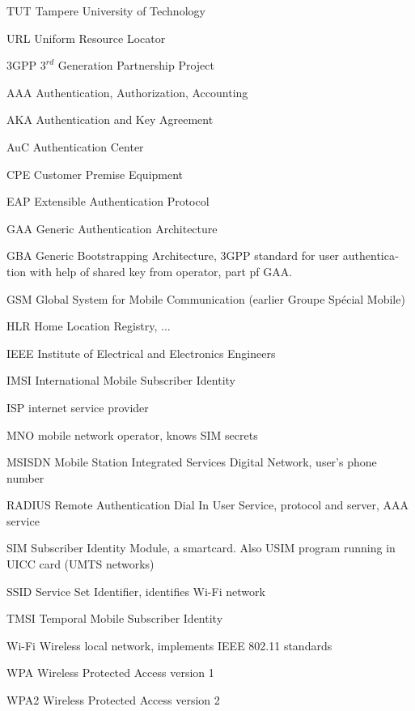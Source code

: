 \documentclass[12pt,a4paper,english]{tutthesis}
\begin{document}
\begin{otherlanguage}{english}
\begin{termlist}
\item [TUT]    Tampere University of Technology
\item [URL]    Uniform Resource Locator
\item[3GPP] $3^{rd}$ Generation Partnership Project
\item[AAA] Authentication, Authorization, Accounting
\item[AKA] Authentication and Key Agreement %
\item[AuC] Authentication Center
\item[CPE] Customer Premise Equipment %
\item[EAP] Extensible Authentication Protocol %
\item[GAA] Generic Authentication Architecture %
\item[GBA] Generic Bootstrapping Architecture, 3GPP standard for user authentication with help of shared key from operator, part pf GAA.
\item[GSM] Global System for Mobile Communication (earlier Groupe Spécial Mobile)
\item[HLR] Home Location Registry, ...
\item[IEEE] Institute of Electrical and Electronics Engineers
\item[IMSI] International Mobile Subscriber Identity
\item[ISP] internet service provider
\item[MNO] mobile network operator, knows SIM secrets
\item[MSISDN] Mobile Station Integrated Services Digital Network, user's phone number
\item[RADIUS] Remote Authentication Dial In User Service, protocol and server,  AAA service 
\item[SIM]  Subscriber Identity Module, a smartcard. Also USIM program running in UICC card (UMTS networks)
\item[SSID] Service Set Identifier, identifies Wi-Fi network
\item[TMSI] Temporal Mobile Subscriber Identity
\item[Wi-Fi] Wireless local network, implements IEEE 802.11 standards
\item[WPA] Wireless Protected Access version 1
\item[WPA2] Wireless Protected Access version 2
\end{termlist} 



\end{otherlanguage}
\end{document}
